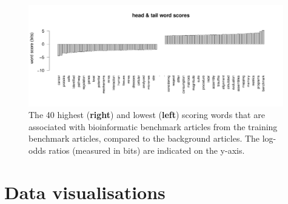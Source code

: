 \documentclass[fleqn,10pt]{SelfArx} %
\begin{document}
\begin{figure}[H] \centering
\includegraphics[width=0.99\textwidth]{wordScores.pdf} \caption{The 40
  highest ({\bf right}) and lowest ({\bf left}) scoring words that are associated with
  bioinformatic benchmark articles from the training benchmark articles,
  compared to the background articles. The log-odds ratios (measured
  in bits) are indicated on the y-axis. }
\label{fig:wordScores} \end{figure}







\clearpage
\newpage

\section*{Data visualisations} %
\end{document}
